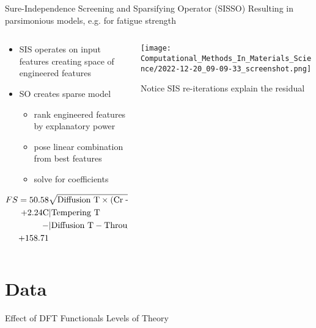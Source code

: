 \documentclass[10pt, aspectratio=169, presentation]{beamer}
\begin{document}
\begin{frame}[label={sec:org615d3e8}]{Sure-Independence Screening and Sparsifying Operator (SISSO)}
Resulting in parsimonious models, e.g. for fatigue strength\autocite{he-2021-learn-inter}
\begin{columns}
\begin{column}{0.45\columnwidth}
\begin{itemize}
\item SIS operates on input features creating space of engineered features
\item SO creates sparse model
\begin{itemize}
\item rank engineered features by explanatory power
\item pose linear combination from best features
\item solve for coefficients
\end{itemize}
\end{itemize}

\begin{align*}
FS = 50.58 &\sqrt{\mbox{Diffusion T} \times (\ce{Cr} + \ce{Ni})}\\
 + 2.24 \ce{C} &|\mbox{Tempering T}\\
 - &|\mbox{Diffusion T} - \mbox{Through-Harden T}||\\
 + 158.71
\end{align*}
\end{column}

\begin{column}{0.55\columnwidth}
\begin{center}
\texttt{[image: Computational\_Methods\_In\_Materials\_Science/2022-12-20\_09-09-33\_screenshot.png]}
\end{center}
Notice SIS re-iterations explain the residual\autocite{ghiringhelli-2017-learn-physic}
\end{column}
\end{columns}
\end{frame}

\section{Data}
\label{sec:org48e5261}
\begin{frame}[label={sec:org5683353}]{Effect of DFT Functionals Levels of Theory}
 
\begin{center}

\end{center}
\end{frame}
\end{document}

